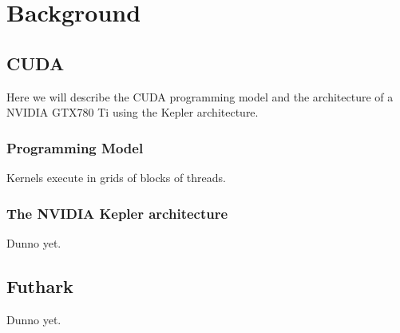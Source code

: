\chapter{Background}

\section{CUDA}

Here we will describe the CUDA programming model and the
architecture of a NVIDIA GTX780 Ti using the Kepler
architecture.


\subsection{Programming Model}

Kernels execute in grids of blocks of threads.


\subsection{The NVIDIA Kepler architecture}

Dunno yet.


\section{Futhark}

Dunno yet.
